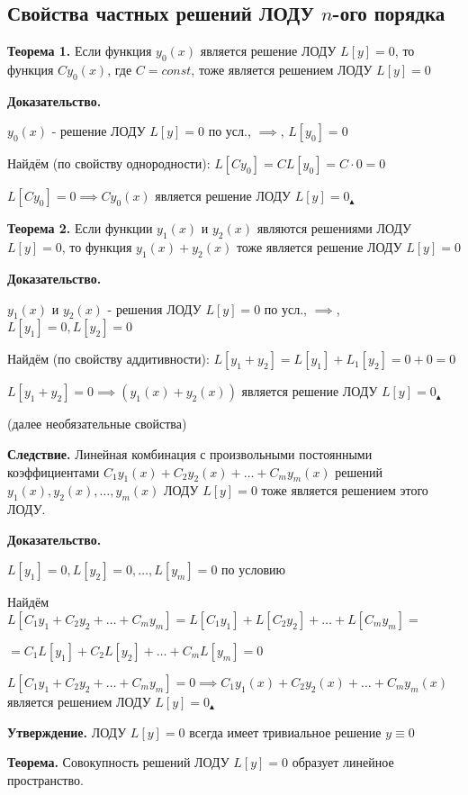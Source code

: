\documentclass[11pt]{article}
\begin{document}
\subsection*{Свойства частных решений ЛОДУ $n$-ого порядка}
\par\textbf{Теорема 1.} Если функция $y_{0}(x)$ является решение ЛОДУ $L[y] = 0$, то функция $Cy_{0}(x)$, где  $C = const$, тоже является решением ЛОДУ $L[y] = 0$
\par\textbf{Доказательство.}
\par $y_{0}(x)$ - решение ЛОДУ $L[y] = 0$ по усл., $\implies$, $L[y_{0}] = 0$
\par Найдём (по свойству однородности): $L[Cy_{0}] = CL[y_{0}] = C \cdot 0 = 0$
\par $L[Cy_{0}] = 0 \implies Cy_{0}(x)$ является решение ЛОДУ $L[y] = 0 _\blacktriangle$
\par\textbf{Теорема 2.} Если функции $y_{1}(x)$ и $y_{2}(x)$ являются решениями ЛОДУ $L[y] = 0$, то функция $y_{1}(x) + y_{2}(x)$ тоже является решение ЛОДУ $L[y] = 0$
\par\textbf{Доказательство.}
\par $y_{1}(x)$ и $y_{2}(x)$ - решения ЛОДУ $L[y] = 0$ по усл., $\implies$, $L[y_{1}] = 0, L[y_{2}] = 0$
\par Найдём (по свойству аддитивности): $L[y_{1} + y_{2}] = L[y_{1}] + L_{1}[y_{2}] = 0 + 0 = 0$
\par $L[y_{1} + y_{2}] = 0 \implies (y_{1}(x) + y_{2}(x))$ является решение ЛОДУ $L[y] = 0 _\blacktriangle$
\par (далее необязательные свойства)
\par\textbf{Следствие.} Линейная комбинация с произвольными постоянными коэффициентами $C_{1}y_{1}(x) + C_{2}y_{2}(x) + \dots + C_{m}y_{m}(x)$ решений $y_{1}(x), y_{2}(x), \dots, y_{m}(x)$ ЛОДУ $L[y] = 0$ тоже является решением этого ЛОДУ.
\par\textbf{Доказательство.}
\par $L[y_{1}] = 0, L[y_{2}] = 0, \dots, L[y_{m}] = 0$ по условию
\par Найдём $L[C_{1}y_{1} + C_{2}y_{2} + \dots + C_{m}y_{m}] = L[C_{1}y_{1}] + L[C_{2}y_{2}] + \dots + L[C_{m}y_{m}] =$
\par $= C_{1}L[y_{1}] + C_{2}L[y_{2}] + \dots + C_{m}L[y_{m}] = 0$
\par $L[C_{1}y_{1} + C_{2}y_{2} + \dots + C_{m}y_{m}] = 0 \implies C_{1}y_{1}(x) + C_{2}y_{2}(x) + \dots + C_{m}y_{m}(x)$ является решением ЛОДУ $L[y] = 0 _\blacktriangle$
\par\textbf{Утверждение.} ЛОДУ $L[y] = 0$ всегда имеет тривиальное решение $y \equiv 0$
\par\textbf{Теорема.} Совокупность решений ЛОДУ $L[y] = 0$ образует линейное пространство.
\end{document}
